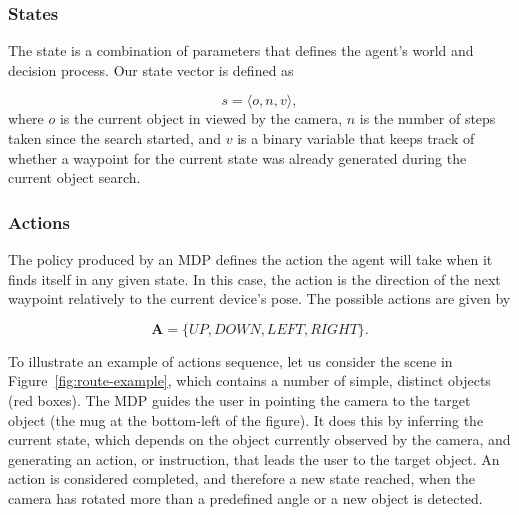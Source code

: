\documentclass[a4paper, twoside]{article}
\begin{document}
\subsubsection{States}\label{sec:states}

\noindent The state is a combination of parameters that defines the agent's world and decision process. Our state vector is defined as

\begin{equation}
  s = \langle o, n, v \rangle, 
\end{equation}
where $o$ is the current object in viewed by the camera, $n$ is the number of steps taken since the search started, and $v$ is a binary variable that keeps track of whether a waypoint for the current state was already generated during the current object search. 

\subsubsection{Actions}

The policy produced by an MDP defines the action the agent will take when it finds itself in any given state. In this case, the action is the direction of the next waypoint relatively to the current device's pose. The possible actions are given by

\begin{equation}
  \mathbf{A} = \{UP, DOWN, LEFT, RIGHT\}.
\end{equation}

To illustrate an example of actions sequence, let us consider the scene in Figure~\ref{fig:route-example}, which contains a number of simple, distinct objects (red boxes). The MDP guides the user in pointing the camera to the target object (the mug at the bottom-left of the figure). It does this by inferring the current state, which depends on the object currently observed by the camera, and generating an action, or instruction, that leads the user to the target object.
An action is considered completed, and therefore a new state reached, when the camera has rotated more than a predefined angle or a new object is detected.
\end{document}
